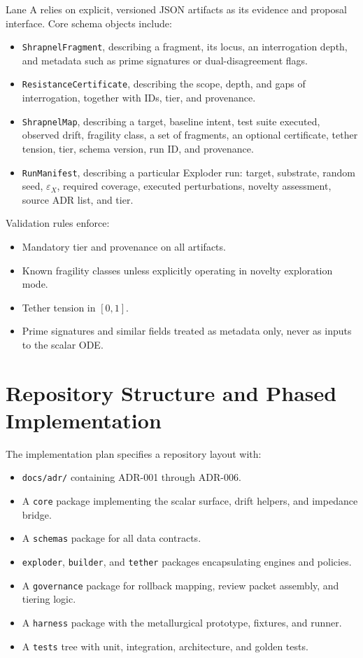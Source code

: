\documentclass[11pt]{article}
\begin{document}
Lane A relies on explicit, versioned JSON artifacts as its evidence and proposal interface. Core schema objects include:
\begin{itemize}
  \item \texttt{ShrapnelFragment}, describing a fragment, its locus, an interrogation depth, and metadata such as prime signatures or dual-disagreement flags.
  \item \texttt{ResistanceCertificate}, describing the scope, depth, and gaps of interrogation, together with IDs, tier, and provenance.
  \item \texttt{ShrapnelMap}, describing a target, baseline intent, test suite executed, observed drift, fragility class, a set of fragments, an optional certificate, tether tension, tier, schema version, run ID, and provenance.
  \item \texttt{RunManifest}, describing a particular Exploder run: target, substrate, random seed, \(\varepsilon_X\), required coverage, executed perturbations, novelty assessment, source ADR list, and tier.
\end{itemize}

Validation rules enforce:
\begin{itemize}
  \item Mandatory tier and provenance on all artifacts.
  \item Known fragility classes unless explicitly operating in novelty exploration mode.
  \item Tether tension in \([0,1]\).
  \item Prime signatures and similar fields treated as metadata only, never as inputs to the scalar ODE.
\end{itemize}

\section{Repository Structure and Phased Implementation}

The implementation plan specifies a repository layout with:
\begin{itemize}
  \item \texttt{docs/adr/} containing ADR-001 through ADR-006.
  \item A \texttt{core} package implementing the scalar surface, drift helpers, and impedance bridge.
  \item A \texttt{schemas} package for all data contracts.
  \item \texttt{exploder}, \texttt{builder}, and \texttt{tether} packages encapsulating engines and policies.
  \item A \texttt{governance} package for rollback mapping, review packet assembly, and tiering logic.
  \item A \texttt{harness} package with the metallurgical prototype, fixtures, and runner.
  \item A \texttt{tests} tree with unit, integration, architecture, and golden tests.
\end{itemize}
\end{document}
